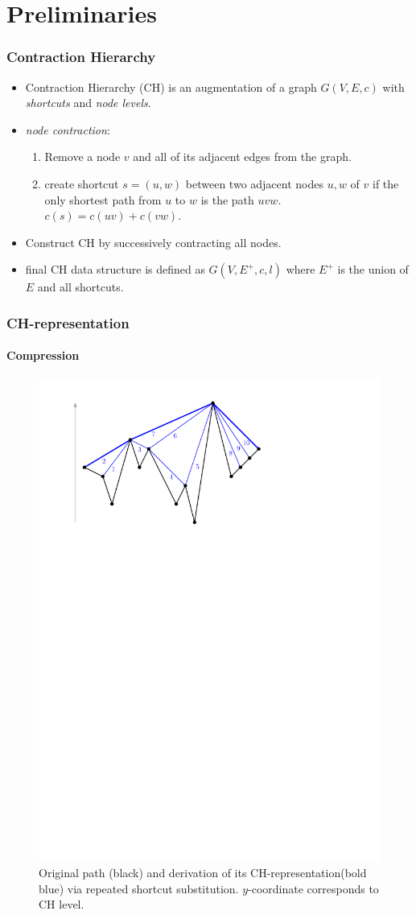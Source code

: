 \documentclass{beamer}
\newcommand{\chrep}{CH-representation\xspace}
\begin{document}
\section{Preliminaries}
\begin{frame}
	\frametitle{Contraction Hierarchy}
	\begin{itemize}
		\item Contraction Hierarchy (CH) is an augmentation of a graph $G(V,E,c)$ with \emph{shortcuts} and \emph{node levels}. \pause
		\item \emph{node contraction}: \pause
		      \begin{enumerate}
			      \item Remove a node $v$ and all of its adjacent edges from the graph. \pause
			      \item create shortcut $s = (u, w)$ between two adjacent nodes $u,w$ of $v$ if the only shortest path from $u$ to $w$ is the path $uvw$. $c(s) = c(uv) + c(vw)$. \pause
		      \end{enumerate}
		\item Construct CH by successively contracting all nodes. \pause
		\item final CH data structure is defined as $G(V, E^+, c, l)$ where $E^+$ is the union of $E$ and all shortcuts.
	\end{itemize}
\end{frame}

\begin{frame}
	\frametitle{\chrep}
	\framesubtitle{Compression}
	\begin{figure}
		\caption{Original path (black) and derivation of its \chrep (bold blue) via repeated shortcut substitution. $y$-coordinate corresponds to CH level.}
		\includegraphics[width=.76\columnwidth]{images/toch}
	\end{figure}
\end{frame}
\end{document}
